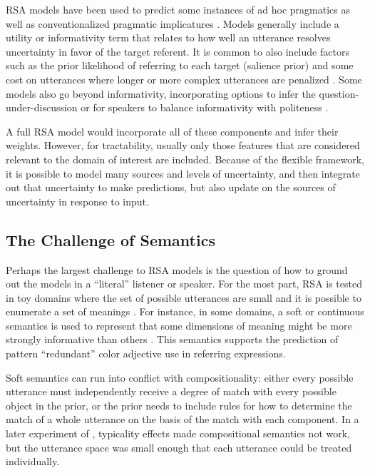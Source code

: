 \documentclass[]{article}
\begin{document}
RSA models have been used to predict some instances of ad hoc pragmatics as well as conventionalized pragmatic implicatures \citep{bergen, degen20200406, goodman2013}. Models generally include a utility or informativity term that relates to how well an utterance resolves uncertainty in favor of the target referent.  It is common to also include factors such as the prior likelihood of referring to each target (salience prior) and some cost on utterances where longer or more complex utterances are penalized \citep{goodman2016}. Some models also go beyond informativity, incorporating options to infer the question-under-discussion \citep{qing2016, kao2014} or for speakers to balance informativity with politeness \citep{yoon2018a}.

A full RSA model would incorporate all of these components and infer their weights. However, for tractability, usually only those features that are considered relevant to the domain of interest are included. Because of the flexible framework, it is possible to model many sources and levels of uncertainty, and then integrate out that uncertainty to make predictions, but also update on the sources of uncertainty in response to input. 

\subsection{The Challenge of Semantics}
Perhaps the largest challenge to RSA models is the question of how to ground out the models in a ``literal'' listener or speaker. For the most part, RSA is tested in toy domains where the set of possible utterances are small and it is possible to enumerate a set of meanings \citep{frank2012a,goodman2013, bergen}. For instance, in some domains, a soft or continuous semantics is used to represent that some dimensions of meaning might be more strongly informative than others \cite{degen20200406}. This semantics supports the prediction of pattern ``redundant'' color adjective use in referring expressions. 

Soft semantics can run into conflict with compositionality: either every possible utterance must independently receive a degree of match with every possible object in the prior, or the prior needs to include rules for how to determine the match of a whole utterance on the basis of the match with each component. In a later experiment of \citep{degen20200406}, typicality effects made compositional semantics not work, but the utterance space was small enough that each utterance could be treated individually. 
\end{document}
